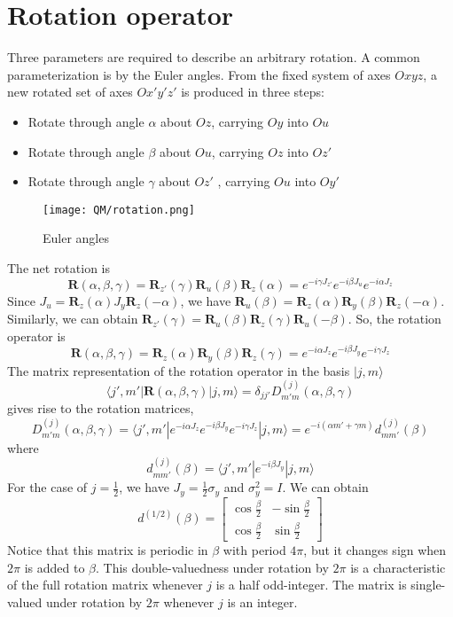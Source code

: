 \documentclass[cyan]{elegantnote}
\begin{document}
\section{Rotation operator}
Three parameters are required to describe an arbitrary rotation. A common parameterization is by the Euler angles. From the fixed system of axes $Oxyz$, a new rotated set of axes $Ox'y'z'$ is produced in three steps:
\begin{itemize}
\item Rotate through angle $\alpha$ about $Oz$, carrying $Oy$ into $Ou$
\item Rotate through angle $\beta$ about $Ou$, carrying $Oz$ into $Oz'$
\item Rotate through angle $\gamma$ about $Oz'$ , carrying $Ou$ into $Oy'$
\end{itemize}
\begin{figure}[!h]
	\centering
	\texttt{[image: QM/rotation.png]}
	\caption{Euler angles}
\end{figure}
The net rotation is
\[\bm{R}(\alpha,\beta,\gamma) = \bm{R}_{z'}(\gamma) \bm{R}_{u}(\beta) \bm{R}_{z}(\alpha) = e^{-i\gamma J_{z'}} e^{-i\beta J_{u}} e^{-i\alpha J_{z}}\]
Since $J_u = \bm{R}_z(\alpha) J_y \bm{R}_z(-\alpha)$, we have $\bm{R}_u(\beta) = \bm{R}_z(\alpha) \bm{R}_y(\beta) \bm{R}_z(-\alpha)$. Similarly, we can obtain $\bm{R}_{z'}(\gamma) = \bm{R}_{u}(\beta) \bm{R}_z(\gamma) \bm{R}_u(-\beta)$. So, the rotation operator is
\[\bm{R}(\alpha,\beta,\gamma) = \bm{R}_{z}(\alpha) \bm{R}_{y}(\beta) \bm{R}_{z}(\gamma) = e^{-i\alpha J_{z}} e^{-i\beta J_{y}} e^{-i\gamma J_{z}}\]
The matrix representation of the rotation operator in the basis $|j,m\rangle$
\[\langle j',m' | \bm{R}(\alpha,\beta,\gamma) | j,m \rangle = \delta_{jj'} D_{m'm}^{(j)}(\alpha,\beta,\gamma)\]
gives rise to the rotation matrices,
\[D_{m'm}^{(j)}(\alpha,\beta,\gamma) = \langle j',m' | e^{-i\alpha J_{z}} e^{-i\beta J_{y}} e^{-i\gamma J_{z}} | j,m \rangle = e^{-i(\alpha m' + \gamma m)} d_{mm'}^{(j)}(\beta)\]
where
\[ d_{mm'}^{(j)}(\beta) = \langle j',m' | e^{-i\beta J_{y}} | j,m \rangle\]
For the case of $j = \frac{1}{2}$, we have $J_y = \frac{1}{2}\sigma_y$ and $\sigma_y^2 = I$. We can obtain
\[d^{(1/2)}(\beta) = \left[ \begin{matrix} \cos \frac{\beta}{2} & -\sin \frac{\beta}{2} \\ \cos \frac{\beta}{2}& \sin \frac{\beta}{2}\end{matrix} \right] \]
Notice that this matrix is periodic in $\beta$ with period $4\pi$, but it changes sign when $2\pi$ is added to $\beta$. This double-valuedness under rotation by $2\pi$ is a characteristic of the full rotation matrix whenever $j$ is a half odd-integer. The matrix is single-valued under rotation by $2\pi$ whenever $j$ is an integer.\\ \\
\end{document}

